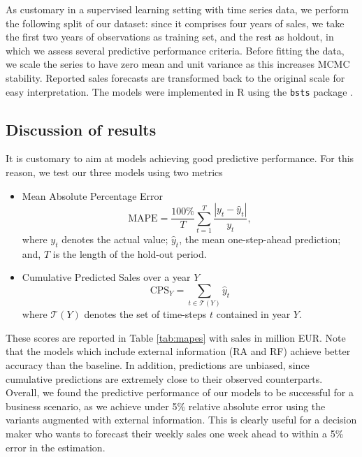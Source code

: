 As customary in a supervised learning setting with time series data, we perform the following split of our dataset: since it comprises four years of sales, we take the first two years of observations as training set, and the rest as holdout, in which we assess several predictive performance criteria. Before fitting the data, we scale the series to have zero mean and unit variance as this increases MCMC stability. Reported sales forecasts are transformed back to the original scale for easy interpretation. The models were implemented in R  using the \texttt{bsts} package \parencite{scott2016bsts}.




\subsection{Discussion of results}

It is customary to aim at models achieving good predictive performance. %
For this reason, we test  our three models using two metrics

\begin{itemize}
\item Mean Absolute Percentage Error $$ \text{MAPE} = \frac{100\%}{T}\sum_{t=1}^T \frac{|y_t - \hat{y}_t|}{y_t},$$
where $y_t$ denotes the actual value; $\hat{y}_t$, the mean one-step-ahead prediction; and, $T$ is the length of the hold-out period.
\item Cumulative Predicted Sales over a year $Y$
$$
\text{CPS}_{Y} = \sum_{t \in \mathcal{T}(Y)} \hat{y}_t
$$
where $\mathcal{T}(Y)$ denotes the set of time-steps $t$ contained in year $Y$.
\end{itemize}
These scores are reported in Table \ref{tab:mapes} with sales in million EUR. Note that the models which include external information (RA and RF) achieve better accuracy than the baseline. In addition, 
predictions are unbiased, since cumulative predictions are extremely close to their observed counterparts. Overall, we found the predictive performance of our models to be successful for a business scenario, as we achieve under 5\% relative absolute error using the variants augmented with external information. This is clearly useful for a decision maker who wants to forecast their weekly sales one week ahead to within a 5\% error in the estimation.

